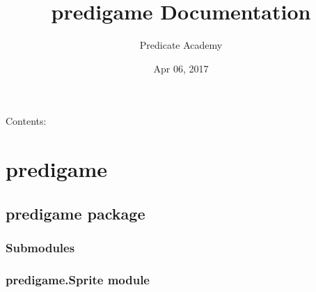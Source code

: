 \documentclass[letterpaper,10pt,english]{sphinxmanual}
\title{predigame Documentation}
\date{Apr 06, 2017}
\author{Predicate Academy}
\begin{document}
\maketitle
\sphinxtableofcontents
{}\label{\detokenize{index::doc}}


Contents:


\chapter{predigame}
\label{\detokenize{modules:welcome-to-predigame-s-documentation}}\label{\detokenize{modules::doc}}\label{\detokenize{modules:predigame}}

\section{predigame package}
\label{\detokenize{predigame:predigame-package}}\label{\detokenize{predigame::doc}}

\subsection{Submodules}
\label{\detokenize{predigame:submodules}}

\subsection{predigame.Sprite module}
\label{\detokenize{predigame:module-predigame.Sprite}}\label{\detokenize{predigame:predigame-sprite-module}}
\end{document}

